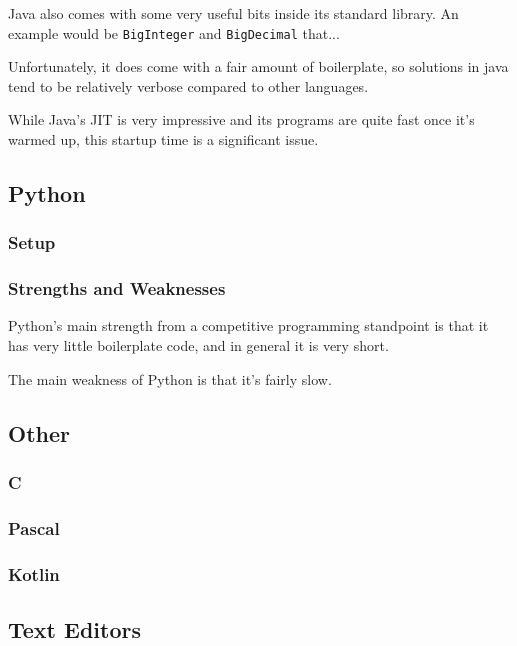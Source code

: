 Java also comes with some very useful bits inside its standard library. An example would be \texttt{BigInteger} and \texttt{BigDecimal} that...

Unfortunately, it does come with a fair amount of boilerplate, so solutions in java tend to be relatively verbose compared to other languages.

While Java's JIT is very impressive and its programs are quite fast once it's warmed up, this startup time is a significant issue.

\subsection{Python}
\subsubsection{Setup}
\subsubsection{Strengths and Weaknesses}

Python's main strength from a competitive programming standpoint is that it has very little boilerplate code, and in general it is very short.

The main weakness of Python is that it's fairly slow.

\subsection{Other}
\subsubsection{C}
\subsubsection{Pascal}
\subsubsection{Kotlin}
\subsection{Text Editors}